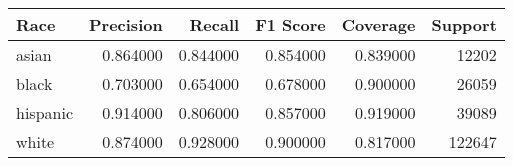 \begin{tabular}{lrrrrr}
\toprule
Race & Precision & Recall & F1 Score & Coverage & Support \\
\midrule
asian & 0.864000 & 0.844000 & 0.854000 & 0.839000 & 12202 \\
black & 0.703000 & 0.654000 & 0.678000 & 0.900000 & 26059 \\
hispanic & 0.914000 & 0.806000 & 0.857000 & 0.919000 & 39089 \\
white & 0.874000 & 0.928000 & 0.900000 & 0.817000 & 122647 \\
\bottomrule
\end{tabular}
